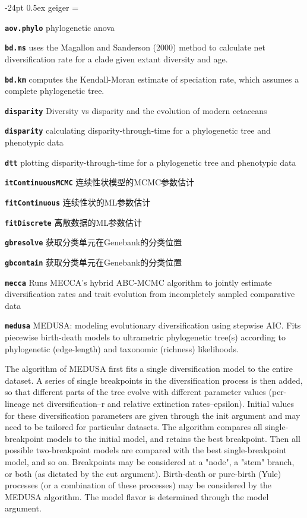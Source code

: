 \documentclass[10pt,landscape]{article}
\makeatletter
\renewcommand\section{\@startsection{section}{1}{0mm}%
                                     {-24pt}%
                                     {0.5ex}%
                                {\color{blue}\normalfont\large\bfseries}}
\newcommand{\bcode}[1]{\texttt{\textbf{#1}}}
\makeatother
\begin{document}
\begin{CJK}{UTF8}{gbsn}
\begin{multicols}{3}
\begin{itemize}
\end{itemize}

\section{geiger}
\everypar={\hangindent=9mm}

\bcode{aov.phylo} phylogenetic anova

\bcode{bd.ms} uses the Magallon and Sanderson (2000) method to calculate net diversification rate for a clade given extant diversity and age. 

\bcode{bd.km} computes the Kendall-Moran estimate of speciation rate, which assumes a complete phylogenetic tree.

\bcode{disparity} Diversity vs disparity and the evolution of modern cetaceans

\bcode{disparity} calculating disparity-through-time for a phylogenetic tree and phenotypic data

\bcode{dtt} plotting disparity-through-time for a phylogenetic tree and phenotypic data

\bcode{itContinuousMCMC} 连续性状模型的MCMC参数估计

\bcode{fitContinuous} 连续性状的ML参数估计

\bcode{fitDiscrete} 离散数据的ML参数估计

\bcode{gbresolve} 获取分类单元在Genebank的分类位置

\bcode{gbcontain} 获取分类单元在Genebank的分类位置

\bcode{mecca} Runs MECCA's hybrid ABC-MCMC algorithm to jointly estimate diversification rates and trait evolution from incompletely sampled comparative data

\bcode{medusa} MEDUSA: modeling evolutionary diversification using stepwise AIC. Fits piecewise birth-death models to ultrametric phylogenetic tree(s) according to phylogenetic (edge-length) and taxonomic (richness) likelihoods.

The algorithm of MEDUSA first fits a single diversification model to the entire dataset. A series of single breakpoints in the diversification process is then added, so that different parts of the tree evolve with different parameter values (per-lineage net diversification–r and relative extinction rates–epsilon). Initial values for these diversification parameters are given through the init argument and may need to be tailored for particular datasets. The algorithm compares all single-breakpoint models to the initial model, and retains the best breakpoint. Then all possible two-breakpoint models are compared with the best single-breakpoint model, and so on. Breakpoints may be considered at a "node", a "stem" branch, or both (as dictated by the cut argument). Birth-death or pure-birth (Yule) processes (or a combination of these processes) may be considered by the MEDUSA algorithm. The model flavor is determined through the model argument.


\end{multicols}
\end{CJK}
\end{document}
